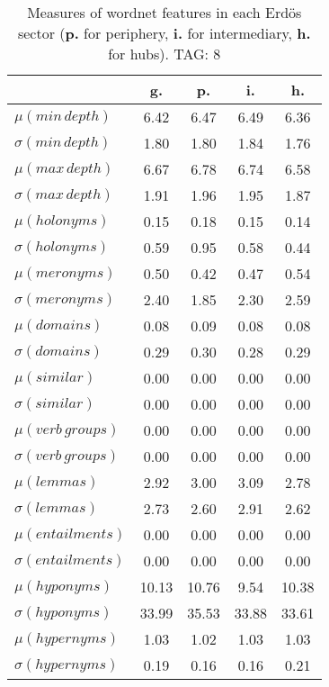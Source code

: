 \begin{table}[h!]
\begin{center}
\begin{tabular}{| l || c | c | c | c |}\hline
 & {\bf g.} & {\bf p.} & {\bf i.} & {\bf h.} \\\hline\hline
$\mu(min\,depth)$ & 6.42  & 6.47  & 6.49  & 6.36 \\
$\sigma(min\,depth)$ & 1.80  & 1.80  & 1.84  & 1.76 \\\hline
$\mu(max\,depth)$ & 6.67  & 6.78  & 6.74  & 6.58 \\
$\sigma(max\,depth)$ & 1.91  & 1.96  & 1.95  & 1.87 \\\hline
$\mu(holonyms)$ & 0.15  & 0.18  & 0.15  & 0.14 \\
$\sigma(holonyms)$ & 0.59  & 0.95  & 0.58  & 0.44 \\\hline
$\mu(meronyms)$ & 0.50  & 0.42  & 0.47  & 0.54 \\
$\sigma(meronyms)$ & 2.40  & 1.85  & 2.30  & 2.59 \\\hline
$\mu(domains)$ & 0.08  & 0.09  & 0.08  & 0.08 \\
$\sigma(domains)$ & 0.29  & 0.30  & 0.28  & 0.29 \\\hline
$\mu(similar)$ & 0.00  & 0.00  & 0.00  & 0.00 \\
$\sigma(similar)$ & 0.00  & 0.00  & 0.00  & 0.00 \\\hline
$\mu(verb\,groups)$ & 0.00  & 0.00  & 0.00  & 0.00 \\
$\sigma(verb\,groups)$ & 0.00  & 0.00  & 0.00  & 0.00 \\\hline
$\mu(lemmas)$ & 2.92  & 3.00  & 3.09  & 2.78 \\
$\sigma(lemmas)$ & 2.73  & 2.60  & 2.91  & 2.62 \\\hline
$\mu(entailments)$ & 0.00  & 0.00  & 0.00  & 0.00 \\
$\sigma(entailments)$ & 0.00  & 0.00  & 0.00  & 0.00 \\\hline
$\mu(hyponyms)$ & 10.13  & 10.76  & 9.54  & 10.38 \\
$\sigma(hyponyms)$ & 33.99  & 35.53  & 33.88  & 33.61 \\\hline
$\mu(hypernyms)$ & 1.03  & 1.02  & 1.03  & 1.03 \\
$\sigma(hypernyms)$ & 0.19  & 0.16  & 0.16  & 0.21 \\\hline
\end{tabular}
\caption{Measures of wordnet features in each Erd\"os sector ({{\bf p.}} for periphery, {{\bf i.}} for intermediary, {{\bf h.}} for hubs). TAG: 8}
\end{center}
\end{table}